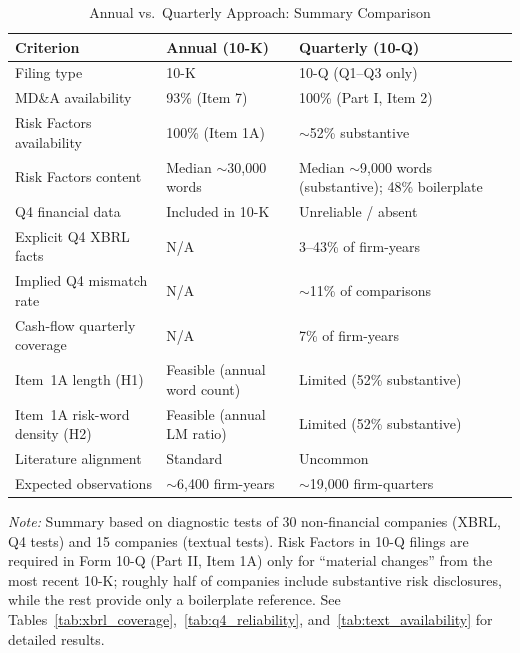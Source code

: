 \begin{table}[htbp]
\centering
\caption{Annual vs.\ Quarterly Approach: Summary Comparison}
\label{tab:annual_vs_quarterly}
\small
\begin{tabularx}{\textwidth}{lXX}
\toprule
Criterion & Annual (10-K) & Quarterly (10-Q) \\
\midrule
Filing type & 10-K & 10-Q (Q1--Q3 only) \\
MD\&A availability & 93\% (Item 7) & 100\% (Part I, Item 2) \\
Risk Factors availability & 100\% (Item 1A) & $\sim$52\% substantive \\
Risk Factors content & Median $\sim$30{,}000 words & Median $\sim$9{,}000 words (substantive); 48\% boilerplate \\
Q4 financial data & Included in 10-K & Unreliable / absent \\
Explicit Q4 XBRL facts & N/A & 3--43\% of firm-years \\
Implied Q4 mismatch rate & N/A & $\sim$11\% of comparisons \\
Cash-flow quarterly coverage & N/A & 7\% of firm-years \\
Item~1A length (H1) & Feasible (annual word count) & Limited (52\% substantive) \\
Item~1A risk-word density (H2) & Feasible (annual LM ratio) & Limited (52\% substantive) \\
Literature alignment & Standard & Uncommon \\
Expected observations & $\sim$6{,}400 firm-years & $\sim$19{,}000 firm-quarters \\
\bottomrule
\end{tabularx}
\par\smallskip
\begin{flushleft}\footnotesize
\textit{Note:} Summary based on diagnostic tests of 30 non-financial companies
(XBRL, Q4 tests) and 15 companies (textual tests). Risk Factors in 10-Q filings
are required in Form 10-Q (Part II, Item 1A) only for ``material changes''
from the most recent 10-K; roughly half of companies include substantive risk
disclosures, while the rest provide only a boilerplate reference. See
Tables~\ref{tab:xbrl_coverage},~\ref{tab:q4_reliability},
and~\ref{tab:text_availability} for detailed results.
\end{flushleft}
\end{table}
